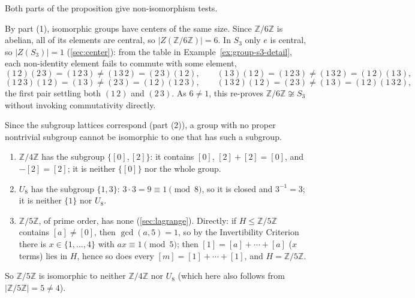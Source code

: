 \documentclass[11pt]{report}
\begin{document}
Both parts of the proposition give non-isomorphism tests.

\begin{exbox}\label{ex:z6z-not-iso-s3-via-centers}
By part (1), isomorphic groups have centers of the same size. Since $\mathbb{Z}/6\mathbb{Z}$ is abelian, all of its elements are central, so $|Z(\mathbb{Z}/6\mathbb{Z})| = 6$. In $S_3$ only $e$ is central, so $|Z(S_3)| = 1$ (\ref{sec:center}): from the table in Example~\ref{ex:group-s3-detail}, each non-identity element fails to commute with some element,
\[ (1\,2)(2\,3) = (1\,2\,3) \neq (1\,3\,2) = (2\,3)(1\,2), \qquad (1\,3)(1\,2) = (1\,2\,3) \neq (1\,3\,2) = (1\,2)(1\,3), \]
\[ (1\,2\,3)(1\,2) = (1\,3) \neq (2\,3) = (1\,2)(1\,2\,3), \qquad (1\,3\,2)(1\,2) = (2\,3) \neq (1\,3) = (1\,2)(1\,3\,2), \]
the first pair settling both $(1\,2)$ and $(2\,3)$. As $6 \neq 1$, this re-proves $\mathbb{Z}/6\mathbb{Z} \not\cong S_3$ without invoking commutativity directly.
\end{exbox}

\begin{exbox}\label{ex:proper-nontrivial-subgroups-z4-u8-z5}
Since the subgroup lattices correspond (part (2)), a group with no proper nontrivial subgroup cannot be isomorphic to one that has such a subgroup.
\begin{enumerate}
    \item $\mathbb{Z}/4\mathbb{Z}$ has the subgroup $\{[0], [2]\}$: it contains $[0]$, $[2] + [2] = [0]$, and $-[2] = [2]$; it is neither $\{[0]\}$ nor the whole group.
    \item $U_8$ has the subgroup $\{1, 3\}$: $3 \cdot 3 = 9 \equiv 1 \pmod 8$, so it is closed and $3^{-1} = 3$; it is neither $\{1\}$ nor $U_8$.
    \item $\mathbb{Z}/5\mathbb{Z}$, of prime order, has none (\ref{sec:lagrange}). Directly: if $H \leq \mathbb{Z}/5\mathbb{Z}$ contains $[a] \neq [0]$, then $\gcd(a, 5) = 1$, so by the Invertibility Criterion there is $x \in \{1, \ldots, 4\}$ with $ax \equiv 1 \pmod 5$; then $[1] = [a] + \cdots + [a]$ ($x$ terms) lies in $H$, hence so does every $[m] = [1] + \cdots + [1]$, and $H = \mathbb{Z}/5\mathbb{Z}$.
\end{enumerate}
So $\mathbb{Z}/5\mathbb{Z}$ is isomorphic to neither $\mathbb{Z}/4\mathbb{Z}$ nor $U_8$ (which here also follows from $|\mathbb{Z}/5\mathbb{Z}| = 5 \neq 4$).
\end{exbox}
\end{document}
